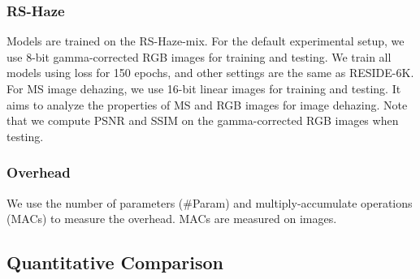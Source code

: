 \documentclass[journal]{IEEEtran}
\begin{document}
\subsubsection{RS-Haze} 
Models are trained on the RS-Haze-mix.
For the default experimental setup, we use 8-bit gamma-corrected RGB images for training and testing.
We train all models using  loss for 150 epochs, and other settings are the same as RESIDE-6K.
For MS image dehazing, we use 16-bit linear images for training and testing.
It aims to analyze the properties of MS and RGB images for image dehazing.
Note that we compute PSNR and SSIM on the gamma-corrected RGB images when testing.

\subsubsection{Overhead}
We use the number of parameters (\#Param) and multiply-accumulate operations (MACs) to measure the overhead.
MACs are measured on  images.

\subsection{Quantitative Comparison}
\end{document}
